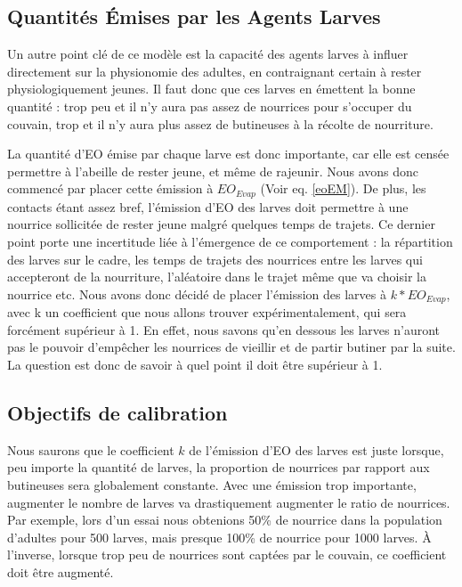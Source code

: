 	
	
	\subsection{Quantités Émises par les Agents Larves}
	\label{subsesctionPHLarves}
	Un autre point clé de ce modèle est la capacité des agents larves à influer directement sur la physionomie des adultes, en contraignant certain à rester physiologiquement jeunes. Il faut donc que ces larves en émettent la bonne quantité : trop peu et il n'y aura pas assez de nourrices pour s'occuper du couvain, trop et il n'y aura plus assez de butineuses à la récolte de nourriture.
	
	La quantité d'EO émise par chaque larve est donc importante, car elle est censée permettre à l'abeille de rester jeune, et même de rajeunir. Nous avons donc commencé par placer cette émission à $EO_{Evap}$ (Voir eq. \ref{eoEM}). De plus, les contacts étant assez bref, l'émission d'EO des larves doit permettre à une nourrice sollicitée de rester jeune malgré quelques temps de trajets. Ce dernier point porte une incertitude liée à l'émergence de ce comportement : la répartition des larves sur le cadre, les temps de trajets des nourrices entre les larves qui accepteront de la nourriture, l'aléatoire dans le trajet même que va choisir la nourrice etc. Nous avons donc décidé de placer l'émission des larves à $k * EO_{Evap}$, avec k un coefficient que nous allons trouver expérimentalement, qui sera forcément supérieur à 1. En effet, nous savons qu'en dessous les larves n'auront pas le pouvoir d'empêcher les nourrices de vieillir et de partir butiner par la suite. La question est donc de savoir à quel point il doit être supérieur à 1.
	
	\subsection{Objectifs de calibration}
	\label{subsectionObjectifCalibration}
	Nous saurons que le coefficient $k$ de l'émission d'EO des larves est juste lorsque, peu importe la quantité de larves, la proportion de nourrices par rapport aux butineuses sera globalement constante. Avec une émission trop importante, augmenter le nombre de larves va drastiquement augmenter le ratio de nourrices. Par exemple, lors d'un essai nous obtenions 50\% de nourrice dans la population d'adultes pour 500 larves, mais presque 100\% de nourrice pour 1000 larves. À l'inverse, lorsque trop peu de nourrices sont captées par le couvain, ce coefficient doit être augmenté.
	
